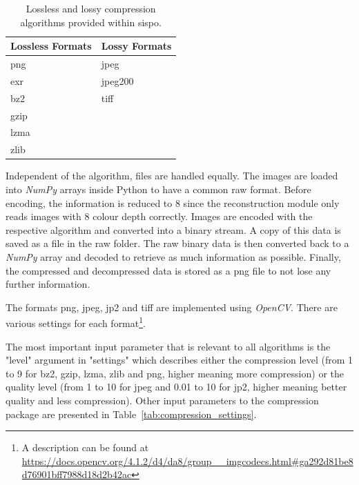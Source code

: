 \begin{table}[htb]
    \centering
    \caption{Lossless and lossy compression algorithms provided within \gls{sispo}.}
    \label{tab:compression_format}
    \begin{tabular}{l|l}
        \textbf{Lossless Formats} & \textbf{Lossy Formats} \\ \hline
        \gls{png}              & \gls{jpeg}           \\
        exr               & jpeg200        \\
        bz2               & tiff           \\
        gzip              &                \\
        lzma              &                \\
        zlib              &               
    \end{tabular}
\end{table}

Independent of the algorithm, files are handled equally. The images are loaded into \textit{NumPy} arrays inside Python to have a common raw format. Before encoding, the information is reduced to \SI{8}{\bit} since the reconstruction module only reads images with \SI{8}{\bit} colour depth correctly. Images are encoded with the respective algorithm and converted into a binary stream. A copy of this data is saved as a file in the raw folder. The raw binary data is then converted back to a \textit{NumPy} array and decoded to retrieve as much information as possible. Finally, the compressed and decompressed data is stored as a \gls{png} file to not lose any further information.

The formats \gls{png}, \gls{jpeg}, \gls{jp2} and tiff are implemented using \textit{OpenCV}. There are various settings for each format\footnote{A description can be found at \url{https://docs.opencv.org/4.1.2/d4/da8/group__imgcodecs.html\#ga292d81be8d76901bff7988d18d2b42ac}}.

The most important input parameter that is relevant to all algorithms is the "level" argument in "settings" which describes either the compression level (from 1 to 9 for bz2, gzip, lzma, zlib and \gls{png}, higher meaning more compression) or the quality level (from 1 to 10 for \gls{jpeg} and 0.01 to 10 for \gls{jp2}, higher meaning better quality and less compression). Other input parameters to the compression package are presented in Table~\ref{tab:compression_settings}.

